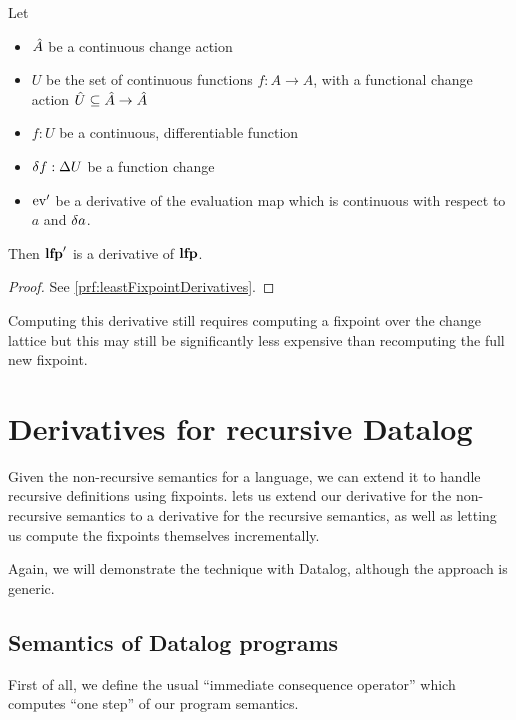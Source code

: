 \begin{thm}[name=Derivatives of least fixpoint operators, restate=leastFixpointDerivatives]
  \label{thm:leastFixpointDerivatives}
  Let
  \begin{itemize}
    \item $\hat{A}$ be a continuous change action
    \item $U$ be the set of continuous functions $f : A \rightarrow A$, 
      with a functional change action $\hat{U} \subseteq \hat{A} \rightarrow \hat{A}$
    \item $f : U$ be a continuous, differentiable function
    \item $\delta f : \Delta U$ be a function change
    \item $\operatorname{ev}'$ be a derivative of the evaluation map which is continuous with
      respect to $a$ and $\delta a$.
  \end{itemize}
  Then $\mathbf{lfp}'$ is a derivative of $\mathbf{lfp}$.
\end{thm}
\ifproofs
\begin{proof}
  See \cref{prf:leastFixpointDerivatives}.
\end{proof}
\fi

Computing this derivative still requires computing a fixpoint \textemdash{} over the change
lattice \textemdash{} but this may still be significantly less expensive than
recomputing the full new fixpoint.

\section{Derivatives for recursive Datalog}
\label{sec:recursiveDatalog}

Given the non-recursive semantics for a language, we can extend it to handle
recursive definitions using fixpoints.  lets us extend our
derivative for the non-recursive semantics to a derivative for the recursive
semantics, as well as letting us compute the fixpoints themselves
incrementally. 

Again, we will demonstrate the technique with Datalog, although the approach is generic.

\subsection{Semantics of Datalog programs}

First of all, we define the usual ``immediate consequence operator'' which
computes ``one step'' of our program semantics.

